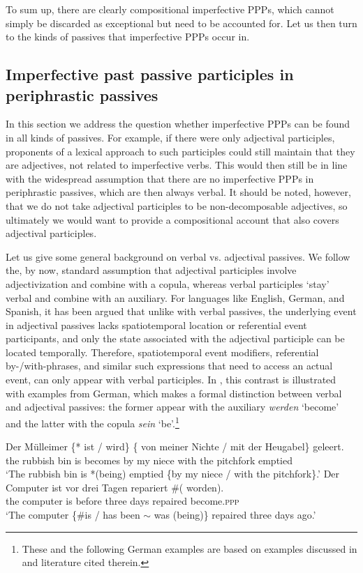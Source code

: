 \documentclass[output=paper,
modfonts,
newtxmath,
hidelinks
]{langscibook}
\begin{document}
To sum up, there are clearly compositional imperfective PPPs, which cannot simply be discarded as exceptional but need to be accounted for. Let us then turn to the kinds of passives that imperfective PPPs occur in.

\subsection{Imperfective past passive participles in periphrastic passives} 
\label{passive}

In this section we address the question whether imperfective PPPs can be found in all kinds of passives. For example, if there were only adjectival participles, proponents of a lexical approach to such participles could still maintain that they are adjectives, not related to imperfective verbs. This would then still be in line with the widespread assumption that there are no imperfective PPPs in periphrastic passives, which are then always verbal. It should be noted, however, that we do not take adjectival participles to be non-decomposable adjectives, so ultimately we would want to provide a compositional account that also covers adjectival participles.

Let us give some general background on verbal vs. adjectival passives. We follow the, by now, standard assumption that adjectival participles involve adjectivization and combine with a copula, whereas verbal participles `stay' verbal and combine with an auxiliary. For languages like English, German, and Spanish, it has been argued \citep[see][and literature cited therein]{gehrkesub15, gehrkenllt, gehrkemarcolingua, alexiadou+lingua} that unlike with verbal passives, the underlying event in adjectival passives lacks spatiotemporal location or referential event participants, and only the state associated with the adjectival participle can be located temporally. Therefore, spatiotemporal event modifiers, referential by-/with-phrases, and similar such expressions that need to access an actual event, can only appear with verbal participles. In , this contrast is illustrated with examples from German, which makes a formal distinction between verbal and adjectival passives: the former appear with the auxiliary \textit{werden} `become' and the latter with the copula \textit{sein} `be'.\footnote{These and the following German examples are based on examples discussed in \citet{gehrkenllt} and literature cited therein.}

\ea\label{reifen}
\ea\gll	Der M\"{u}lleimer \{*\hspace{-2pt} ist / wird\} \{\hspace{-2pt} von meiner Nichte / mit der Heugabel\} geleert.\\
	the {rubbish bin} {} is {} becomes {} by my niece {} with the pitchfork emptied\\
\glt	`The rubbish bin is *(being) emptied \{by my niece / with the pitchfork\}.'
\ex\gll	Der Computer ist vor drei Tagen repariert \#(\hspace{-2pt} worden).\\
	the computer is before three days repaired {} become.\textsc{ppp} \\
\glt	`The computer \{\#is / has been $\sim$ was (being)\} repaired three days ago.'
\z\z
\end{document}
